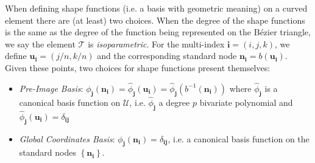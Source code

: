 \documentclass[letterpaper,10pt]{article}
\theoremstyle{definition}
\newcommand{\utri}{\mathcal{U}}
\begin{document}
When defining shape functions (i.e. a basis with geometric meaning) on a
curved element there are (at least) two choices. When the degree of the
shape functions is the same as the degree of the function being
represented on the B\'{e}zier triangle,
we say the element \(\mathcal{T}\) is \emph{isoparametric}.
For the multi-index
\(\bm{i} = (i, j , k)\), we define \(\bm{u}_{\bm{i}} =
\left(j/n, k/n\right)\) and the corresponding standard node
\(\bm{n}_{\bm{i}} = b\left(\bm{u}_{\bm{i}}\right)\).
Given these points, two choices for shape functions present
themselves:
\begin{itemize}
  \itemsep 0em
  \item \emph{Pre-Image Basis}:
    \(\phi_{\bm{j}}\left(\bm{n}_{\bm{i}}\right) =
      \widehat{\phi}_{\bm{j}}\left(\bm{u}_{\bm{i}}\right) =
      \widehat{\phi}_{\bm{j}}\left(b^{-1}\left(
      \bm{n}_{\bm{i}}\right)\right)\)
    where \(\widehat{\phi}_{\bm{j}}\) is a canonical basis function
    on \(\utri\), i.e.
    \(\widehat{\phi}_{\bm{j}}\) a degree \(p\) bivariate polynomial and
    \(\widehat{\phi}_{\bm{j}}\left(\bm{u}_{\bm{i}}\right) =
    \delta_{\bm{i} \bm{j}}\)
  \item \emph{Global Coordinates Basis}:
    \(\phi_{\bm{j}}\left(\bm{n}_{\bm{i}}\right) =
    \delta_{\bm{i} \bm{j}}\), i.e. a canonical basis function
    on the standard nodes \(\left\{\bm{n}_{\bm{i}}\right\}\).
\end{itemize}
\end{document}
